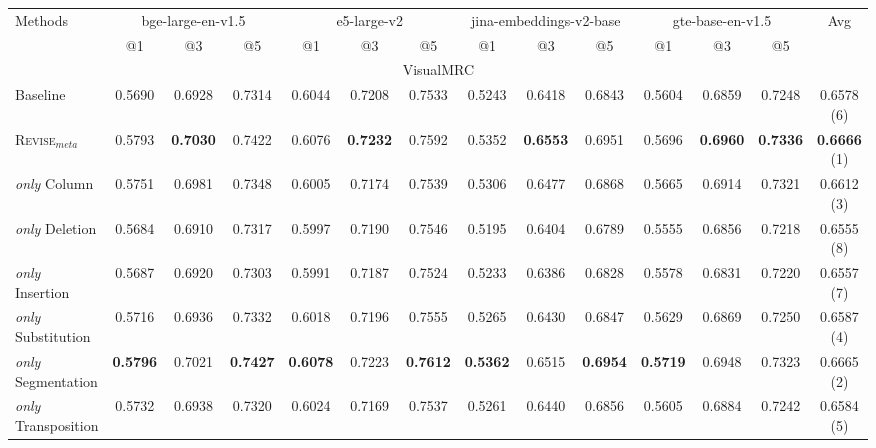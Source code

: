 \begin{table}[t!]
\centering
\renewcommand{\arraystretch}{1}
\setlength{\tabcolsep}{9pt}

\resizebox{0.95\textwidth}{!}
{
\begin{tabular}{lccc ccc ccc ccc c}
\toprule
 \multirow{2.3}{*}{Methods}  & \multicolumn{3}{c}{bge-large-en-v1.5} & \multicolumn{3}{c}{e5-large-v2} & \multicolumn{3}{c}{jina-embeddings-v2-base} & \multicolumn{3}{c}{gte-base-en-v1.5} & \multirow{2}{*}{Avg} \\
\cmidrule(lr){2-4} \cmidrule(lr){5-7} \cmidrule(lr){8-10} \cmidrule(lr){11-13}
 & @1 & @3 & @5 & @1 & @3 & @5 & @1 & @3 & @5 & @1 & @3 & @5 &  \\

\midrule
\multicolumn{14}{c}{VisualMRC}\\
\midrule

Baseline        
    & 0.5690 & 0.6928 & 0.7314
    & 0.6044 & 0.7208 & 0.7533
    & 0.5243 & 0.6418 & 0.6843
    & 0.5604 & 0.6859 & 0.7248
    & 0.6578 (6)\\\hline
\textsc{Revise}$_{meta}$         
    & 0.5793 & \textbf{0.7030} & 0.7422
    & 0.6076 & \textbf{0.7232} & 0.7592
    & 0.5352 & \textbf{0.6553} & 0.6951
    & 0.5696 & \textbf{0.6960} & \textbf{0.7336}
    & \textbf{0.6666} (1) \\

\textit{only} Column
    & 0.5751 & 0.6981 & 0.7348
    & 0.6005 & 0.7174 & 0.7539
    & 0.5306 & 0.6477 & 0.6868
    & 0.5665 & 0.6914 & 0.7321
    & 0.6612 (3)\\
\textit{only} Deletion
    & 0.5684 & 0.6910 & 0.7317
    & 0.5997 & 0.7190 & 0.7546
    & 0.5195 & 0.6404 & 0.6789
    & 0.5555 & 0.6856 & 0.7218
    & 0.6555 (8)\\
\textit{only} Insertion
    & 0.5687 & 0.6920 & 0.7303
    & 0.5991 & 0.7187 & 0.7524
    & 0.5233 & 0.6386 & 0.6828
    & 0.5578 & 0.6831 & 0.7220
    & 0.6557 (7)\\
\textit{only} Substitution
    & 0.5716 & 0.6936 & 0.7332
    & 0.6018 & 0.7196 & 0.7555
    & 0.5265 & 0.6430 & 0.6847
    & 0.5629 & 0.6869 & 0.7250
    & 0.6587 (4)\\
\textit{only} Segmentation
    & \textbf{0.5796} & 0.7021 & \textbf{0.7427}
    & \textbf{0.6078} & 0.7223 & \textbf{0.7612}
    & \textbf{0.5362} & 0.6515 & \textbf{0.6954}
    & \textbf{0.5719} & 0.6948 & 0.7323
    & 0.6665 (2)\\
\textit{only} Transposition
    & 0.5732 & 0.6938 & 0.7320
    & 0.6024 & 0.7169 & 0.7537
    & 0.5261 & 0.6440 & 0.6856
    & 0.5605 & 0.6884 & 0.7242
    & 0.6584 (5)\\


\end{tabular}}
\end{table}
